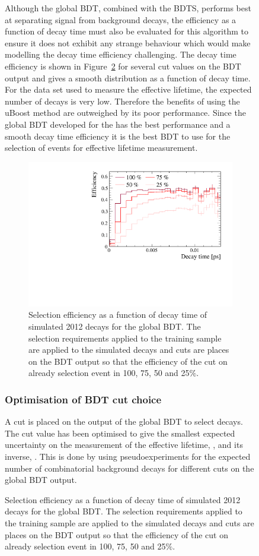 \begin{figure}[tbp]
Although the global BDT, combined with the BDTS, performs best at separating signal from background decays, the efficiency as a function of decay time must also be evaluated for this algorithm to ensure it does not exhibit any strange behaviour which would make modelling the decay time efficiency challenging. The decay time efficiency is shown in Figure~\ref{fig:accptsBFBDTs} for several cut values on the BDT output and gives a smooth distribution as a function of decay time. For the data set used to measure the \bsmumu effective lifetime, the expected number of \bsmumu decays is very low. Therefore the benefits of using the uBoost method are outweighed by its poor performance. Since the global BDT developed for the \BFm has the best performance and a smooth decay time efficiency it is the best BDT to use for the selection of events for effective lifetime measurement. 
\begin{figure}[htbp]
    \centering
        \includegraphics[width=0.6 \textwidth]{./Figs/Selection/BDT1_acceptances.pdf}
    \caption{Selection efficiency as a function of decay time of simulated 2012 \bsmumu decays for the global BDT. The selection requirements applied to the training sample are applied to the simulated decays and cuts are places on the BDT output so that the efficiency of the cut on already selection event in 100, 75, 50 and 25$\%$. }
    \label{fig:accptsBFBDTs}
\end{figure}

\subsubsection{Optimisation of BDT cut choice}
\label{sec:globalBDToptimisation}

A cut is placed on the output of the global BDT to select \bsmumu decays. The cut value has been optimised to give the smallest expected uncertainty on the measurement of the \bsmumu effective lifetime, \tmumu, and its inverse, \invtmumu. This is done by using pseudoexperiments for the expected number of \bsmumu combinatorial background decays for different cuts on the global BDT output. %


\end{figure}
